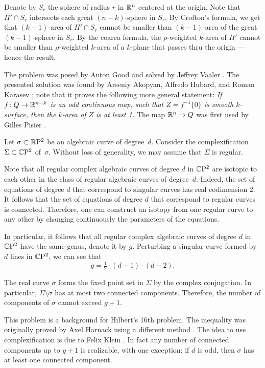 Denote by $S_r$ the sphere of radius $r$ in $\mathbb{R}^n$ centered at the origin.
Note that $\Pi'\cap S_r$ intersects each great $(n-k)$-sphere in $S_r$.
By Crofton's formula, we get that $(k-1)$-area of $\Pi'\cap S_r$ cannot be smaller than $(k-1)$-area of the great $(k-1)$-sphere in $S_r$.
By the coarea formula, the $\rho$-weighted $k$-area of $\Pi'$ cannot be smaller than $\rho$-weighted $k$-area of a $k$-plane that passes thru the origin --- hence the result.
\qeds

The problem was posed by Anton Good
and solved by Jeffrey Vaaler \cite{vaaler}.
The presented solution was found by Arseniy Akopyan, Alfredo Hubard, and Roman Karasev \cite{akopyan-hubard-karasev};
note that it proves the following more general statement:
\textit{If $f\colon Q \to \mathbb{R}^{n-k}$ is an odd continuous map, such that $Z = f^{-1}\{0\}$ is smooth $k$-surface, then the $k$-area of $Z$ is at least 1.}
The map $\mathbb{R}^n\to Q$ was first used by Gilles Pisier \cite[p. 182]{pisier}.



Let $\sigma\subset \mathbb{R}\mathrm{P}^2$ be an algebraic curve of degree~$d$.
Consider the complexification $\Sigma\subset \mathbb{C}\mathrm{P}^2$ of~$\sigma$.
Without loss of generality, we may assume that $\Sigma$ is regular.

Note that all regular complex algebraic curves of degree $d$ in $\mathbb{C}\mathrm{P}^2$
are isotopic to each other in the class of regular algebraic curves of degree~$d$.
Indeed, the set of equations of degree $d$ that correspond to singular curves has real codimension 2.
It follows that the set of equations of degree $d$ that correspond to regular curves is connected.
Therefore, one can construct an isotopy from one regular curve to any other by changing continuously the parameters of the equations.

In particular, it follows that all regular complex algebraic curves of degree $d$ in $\mathbb{C}\mathrm{P}^2$ have the same genus,
denote it by $g$.
Perturbing a singular curve formed by $d$ lines in $\mathbb{C}\mathrm{P}^2$,
we can see that 
\[g=\tfrac12\cdot(d-1)\cdot(d-2).\]

The real curve $\sigma$ forms the fixed point set in $\Sigma$ by the complex conjugation.
In particular, $\Sigma\setminus\sigma$ has at most two connected components.
Therefore, the number of components of $\sigma$ cannot exceed $g+1$.
\qeds

This problem is a background for Hilbert's 16th problem.
The inequality was originally proved 
by Axel Harnack using a different method \cite{harnack}.
The idea to use complexification is due to Felix Klein \cite{klein}.
In fact any number of connected components up to $g+1$ is realizable, with one exception:
if $d$ is odd, then $\sigma$ has at least one connected component. 


